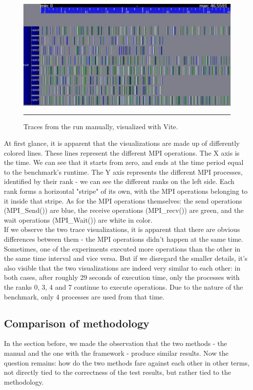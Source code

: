 \begin{figure}[htbp]
  \centering
    \includegraphics[scale=0.7]{./Figures/lu_B_8_manual1.jpg}
    \rule{35em}{0.5pt}
  \caption[Traces from the experiment run manually]{Traces from the
    run manually, visualized with Vite.}
  \label{fig:mex_traces}
\end{figure}

At first glance, it is apparent that the visualizations are made up of
differently colored lines. These lines represent the different MPI
operations. The X axis is the time. We can see that it starts from
zero, and ends at the time period equal to the benchmark's
runtime. The Y axis represents the different MPI processes, identified
by their rank - we can see the different ranks on the left side. Each
rank forms a horizontal "stripe" of its own, with the MPI operations
belonging to it inside that stripe. As for the MPI operations
themselves: the send operations (MPI\_Send()) are blue, the receive
operations (MPI\_recv()) are green, and the wait operations
(MPI\_Wait()) are white in color.\\[0.3cm]
If we observe the two trace visualizations, it is apparent that there
are obvious differences between them - the MPI operations didn't
happen at the same time. Sometimes, one of the experiments executed
more operations than the other in the same time interval and vice
versa. But if we disregard the smaller details, it's also visible that
the two visualizations are indeed very similar to each other: in both
cases, after roughly 29 seconds of execution time, only the processes
with the ranks 0, 3, 4 and 7 continue to execute operations. Due to
the nature of the benchmark, only 4 processes are used from that time.
\subsection{Comparison of methodology}
In the section before, we made the observation that the two methods -
the manual and the one with the framework - produce similar
results. Now the question remains: how do the two methods fare against
each other in other terms, not directly tied to the correctness of the
test results, but rather tied to the methodology.
